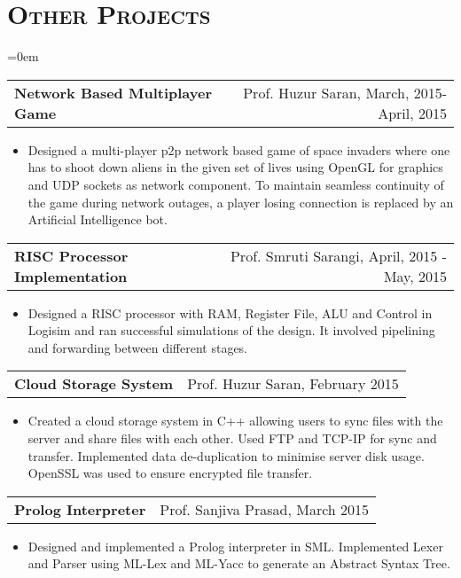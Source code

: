 \documentclass{article}
\makeatletter
\newenvironment{longversion}{}{} %
\newcommand{\headerrow}[2]
{\begin{tabular*}{\linewidth}{l@{\extracolsep{\fill}}r}
	#1 &
	#2 \\
\end{tabular*}}
\newcommand{\tmpsection}[1]{}
\let\tmpsection=\section
\renewcommand{\section}[1]{\tmpsection*{\textsc{#1}}}
\makeatother
\begin{document}
\begin{longversion}
\section{Other Projects}
\begin{list} {}{\leftmargin=0em}
\setlength{\leftmargin}{0pt}


\item[]
  \headerrow {\textbf{Network Based Multiplayer Game}} {Prof. Huzur Saran, March, 2015- April, 2015}
  \begin{itemize} \item[]
  Designed a multi-player p2p network based game of space invaders where one has to shoot down aliens in the given set of lives using OpenGL for graphics and UDP sockets as network component. To maintain seamless continuity of the game during network outages, a player losing connection is replaced by an Artificial Intelligence bot. 
  \end{itemize}


\item[]
  \headerrow{ \textbf{RISC Processor Implementation}} {Prof. Smruti Sarangi, April, 2015 - May, 2015}
  \begin{itemize} \item[]
  Designed a RISC processor with RAM, Register File, ALU and Control in Logisim and ran successful simulations of the design. It involved pipelining and forwarding between different stages.
  \end{itemize}

\item[]
  \headerrow{ \textbf{Cloud Storage System}} {Prof. Huzur Saran, February 2015}
  \begin{itemize} \item[]
  Created a cloud storage system in C++ allowing users to sync files with the server and share files with each other. Used FTP and TCP-IP for sync and transfer. Implemented data de-duplication to minimise server disk usage. OpenSSL was used to ensure encrypted file transfer.
  \end{itemize}

\item[]
  \headerrow{ \textbf{Prolog Interpreter}} {Prof. Sanjiva Prasad, March 2015}
  \begin{itemize} \item[]
  Designed and implemented a Prolog interpreter in SML. Implemented Lexer and Parser using ML-Lex and ML-Yacc to generate an Abstract Syntax Tree.
  \end{itemize}

\end{list}

\end{longversion}
\end{document}
